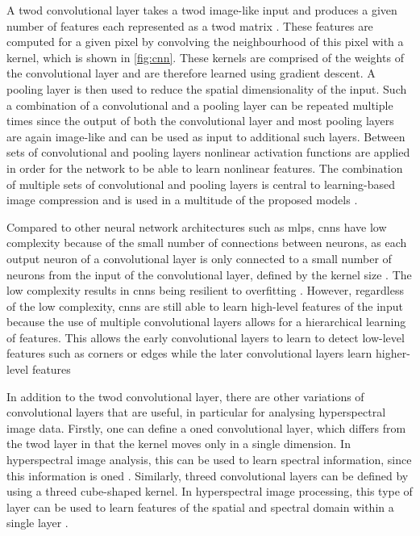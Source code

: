 A \ac{twod} convolutional layer takes a \ac{twod} image-like input and produces a given number of features each represented as a \ac{twod} matrix \citep{gu_recent_2018}. These features are computed for a given pixel by convolving the neighbourhood of this pixel with a kernel, which is shown in \autoref{fig:cnn}. These kernels are comprised of the weights of the convolutional layer and are therefore learned using gradient descent. A pooling layer is then used to reduce the spatial dimensionality of the input. Such a combination of a convolutional and a pooling layer can be repeated multiple times since the output of both the convolutional layer and most pooling layers are again image-like and can be used as input to additional such layers. Between sets of convolutional and pooling layers nonlinear activation functions are applied in order for the network to be able to learn nonlinear features. The combination of multiple sets of convolutional and pooling layers is central to learning-based image compression and is used in a multitude of the proposed models \citep{balle_end--end_2017,balle_variational_2018,kuester_1d-convolutional_2021,kuester_transferability_2022,guo_learned_2021}.

Compared to other neural network architectures such as \acp{mlp}, \acp{cnn} have low complexity because of the small number of connections between neurons, as each output neuron of a convolutional layer is only connected to a small number of neurons from the input of the convolutional layer, defined by the kernel size \citep{gu_recent_2018}. The low complexity results in \acp{cnn} being resilient to overfitting \citep{oshea_introduction_2015,gu_recent_2018}. However, regardless of the low complexity, \acp{cnn} are still able to learn high-level features of the input because the use of multiple convolutional layers allows for a hierarchical learning of features. This allows the early convolutional layers to learn to detect low-level features such as corners or edges while the later convolutional layers learn higher-level features \citep{gu_recent_2018}

In addition to the \ac{twod} convolutional layer, there are other variations of convolutional layers that are useful, in particular for analysing hyperspectral image data. Firstly, one can define a \ac{oned} convolutional layer, which differs from the \ac{twod} layer in that the kernel moves only in a single dimension. In hyperspectral image analysis, this can be used to learn spectral information, since this information is \ac{oned} \citep{kuester_1d-convolutional_2021,kuester_transferability_2022}. Similarly, \ac{threed} convolutional layers can be defined by using a \ac{threed} cube-shaped kernel. In hyperspectral image processing, this type of layer can be used to learn features of the spatial and spectral domain within a single layer \citep{guo_learned_2021}.


